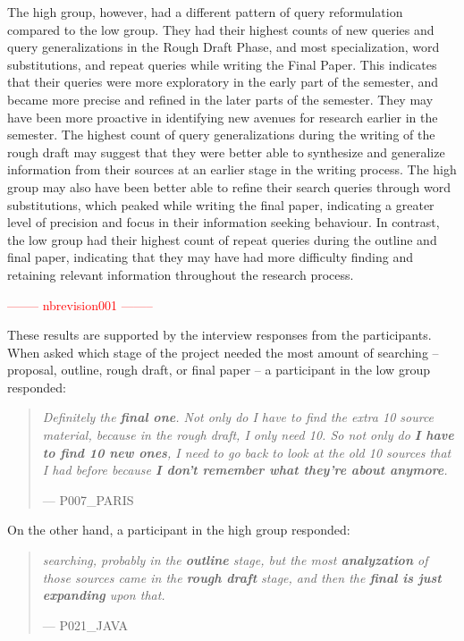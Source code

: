 \documentclass[letterpaper, nobind]{templates/ociamthesis}
\begin{document}
The high group, however, had a different pattern of query reformulation compared to the low group.
They had their highest counts of new queries and query generalizations in the Rough Draft Phase, and most specialization, word substitutions, and repeat queries while writing the Final Paper.
This indicates that their queries were more exploratory in the early part of the semester, and became more precise and refined in the later parts of the semester.
They may have been more proactive in identifying new avenues for research earlier in the semester.
The highest count of query generalizations during the writing of the rough draft may suggest that they were better able to synthesize and generalize information from their sources at an earlier stage in the writing process.
The high group may also have been better able to refine their search queries through word substitutions, which peaked while writing the final paper, indicating a greater level of precision and focus in their information seeking behaviour.
In contrast, the low group had their highest count of repeat queries during the outline and final paper, indicating that they may have had more difficulty finding and retaining relevant information throughout the research process.

\textcolor{red}{-------- nbrevision001 --------}

These results are supported by the interview responses from the participants.
When asked which stage of the project needed the most amount of searching -- proposal, outline, rough draft, or final paper -- a participant in the low group responded:

\begin{quote}
\emph{Definitely the \textbf{final one}. Not only do I have to find the extra 10 source material, because in the rough draft, I only need 10. So not only do \textbf{I have to find 10 new ones}, I need to go back to look at the old 10 sources that I had before because \textbf{I don't remember what they're about anymore}.}

\hfill --- P007\_PARIS
\end{quote}

On the other hand, a participant in the high group responded:

\begin{quote}
\emph{searching, probably in the \textbf{outline} stage, but the most \textbf{analyzation} of those sources came in the \textbf{rough draft} stage, and then the \textbf{final is just expanding} upon that.}

\hfill --- P021\_JAVA
\end{quote}
\end{document}
